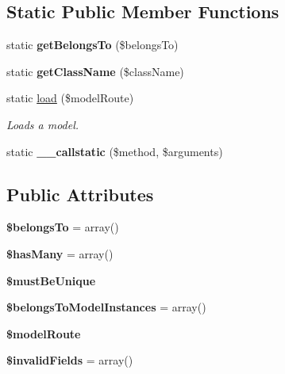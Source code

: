 \subsection*{Static Public Member Functions}
\begin{DoxyCompactItemize}
\item 
\hypertarget{class_model_aa72bdc7e7f0080eed25a002a0bcfffa9}{
static {\bfseries getBelongsTo} (\$belongsTo)}
\label{class_model_aa72bdc7e7f0080eed25a002a0bcfffa9}

\item 
\hypertarget{class_model_a3bdad3f52a4db75269fd42f9bf9f53dd}{
static {\bfseries getClassName} (\$className)}
\label{class_model_a3bdad3f52a4db75269fd42f9bf9f53dd}

\item 
static \hyperlink{class_model_a813e76a68fd3d1f4e8d5b8d8a2cfba2a}{load} (\$modelRoute)
\begin{DoxyCompactList}\small\item\em Loads a model. \item\end{DoxyCompactList}\item 
\hypertarget{class_model_a214eae10dee2aaaa8fa3742bee95900c}{
static {\bfseries \_\-\_\-callstatic} (\$method, \$arguments)}
\label{class_model_a214eae10dee2aaaa8fa3742bee95900c}

\end{DoxyCompactItemize}
\subsection*{Public Attributes}
\begin{DoxyCompactItemize}
\item 
\hypertarget{class_model_afa7691c7389141a1fb95227332d0b214}{
{\bfseries \$belongsTo} = array()}
\label{class_model_afa7691c7389141a1fb95227332d0b214}

\item 
\hypertarget{class_model_a6c957f0c9e27bb694c996bdc16845c58}{
{\bfseries \$hasMany} = array()}
\label{class_model_a6c957f0c9e27bb694c996bdc16845c58}

\item 
\hypertarget{class_model_ac2d7dc9a6b543ae17df667dbbae55489}{
{\bfseries \$mustBeUnique}}
\label{class_model_ac2d7dc9a6b543ae17df667dbbae55489}

\item 
\hypertarget{class_model_ac84316e4a6b5abd58675b81ef50c93b2}{
{\bfseries \$belongsToModelInstances} = array()}
\label{class_model_ac84316e4a6b5abd58675b81ef50c93b2}

\item 
\hypertarget{class_model_afa090f37536e2541fe10ba2b413e2866}{
{\bfseries \$modelRoute}}
\label{class_model_afa090f37536e2541fe10ba2b413e2866}

\item 
\hypertarget{class_model_a8ea89d71867bf3eb1795b283ce381f7c}{
{\bfseries \$invalidFields} = array()}
\label{class_model_a8ea89d71867bf3eb1795b283ce381f7c}

\end{DoxyCompactItemize}
